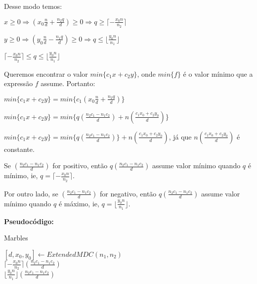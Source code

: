 Desse modo temos:
\newline

$x\geq0 \Rightarrow (x_0\frac{n}{d} + \frac{n_2q}{d})\geq 0 \Rightarrow q \geq \lceil -\frac{x_0n}{n_2} \rceil$
\newline

$y\geq0 \Rightarrow (y_0\frac{n}{d} - \frac{n_1q}{d}) \geq 0 \Rightarrow q \leq \lfloor \frac{y_0n}{n_1} \rfloor$
\newline

$\lceil -\frac{x_0n}{n_2} \rceil \leq q \leq \lfloor \frac{y_0n}{n_1} \rfloor$
\newline

Queremos encontrar o valor $min\{c_1x+c_2y\}$, onde $min\{f\}$ é o valor mínimo que a expressão $f$ assume. Portanto:
\newline

$min\{c_1x+c_2y\} = min\big\{c_1(x_0\frac{n}{d} + \frac{n_2q}{d})\big\}$ 
\newline

$min\{c_1x+c_2y\} = min\big\{q(\frac{n_2c_1 - n_1c_2}{d}) + n(\frac{c_1x_0+c_2y_0}{d})\big\}$ 
\newline

$min\{c_1x+c_2y\} = min\big\{q(\frac{n_2c_1 - n_1c_2}{d})\big\} + n(\frac{c_1x_0+c_2y_0}{d})$, já que $n(\frac{c_1x_0+c_2y_0}{d})$ é constante. 
\newline

Se $(\frac{n_2c_1 - n_1c_2}{d})$ for positivo, então $q(\frac{n_2c_1 - n_1c_2}{d})$ assume valor mínimo quando $q$ é mínimo, ie, $q=\lceil -\frac{x_0n}{n_2} \rceil$.

Por outro lado, se $(\frac{n_2c_1 - n_1c_2}{d})$ for negativo, então $q(\frac{n_2c_1 - n_1c_2}{d})$ assume valor mínimo quando $q$ é máximo, ie, $q=\lfloor \frac{y_0n}{n_1} \rfloor$.
\newline

\textbf{Pseudocódigo:}
\begin{algorithm}
\caption{Marbles}
\begin{algorithmic}[1]

\State $[d,x_0,y_0] \gets ExtendedMDC(n_1,n_2)$
\\
\State \Return $\lceil -\frac{x_0n}{n_2} \rceil (\frac{n_2c_1 - n_1c_2}{d})$
\\
\Else
\State \Return $\lfloor \frac{y_0n}{n_1} \rfloor (\frac{n_2c_1 - n_1c_2}{d})$
\EndIf
\EndProcedure
\end{algorithmic}
\end{algorithm}
\newline

